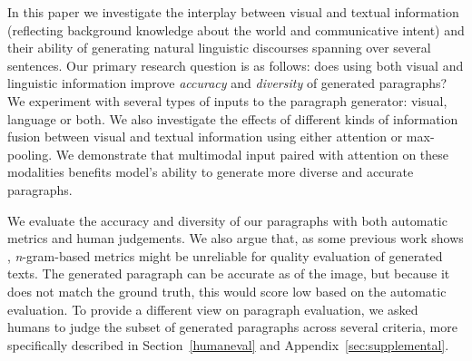 \documentclass[11pt,a4paper]{article}
\begin{document}
In this paper we investigate the interplay between visual and textual information (reflecting background knowledge about the world and communicative intent) and their ability of generating natural linguistic discourses spanning over several sentences.
Our primary research question is as follows: does %
using both visual and linguistic information improve \emph{accuracy} and \emph{diversity} of generated paragraphs?
We experiment with several types of inputs to the paragraph generator: visual, language or both.
We also investigate the effects of different kinds of information fusion between visual and textual information using either attention or max-pooling. %
We demonstrate that multimodal input paired with attention on these modalities benefits model's ability to generate more diverse and accurate paragraphs. %

We evaluate the accuracy and diversity of our paragraphs with both automatic metrics and human judgements.
We also argue that, as some previous work shows \cite{vanderlee2019}, \textit{n}-gram-based metrics might be unreliable for quality evaluation of generated texts.
The generated paragraph can be accurate as of the image, but because it does not match the ground truth, this would score low based on the automatic evaluation.
To provide a different view on paragraph evaluation, we asked humans to judge the subset of generated paragraphs across several criteria, more specifically described in Section~\ref{humaneval} and Appendix~\ref{sec:supplemental}.


\end{document}
